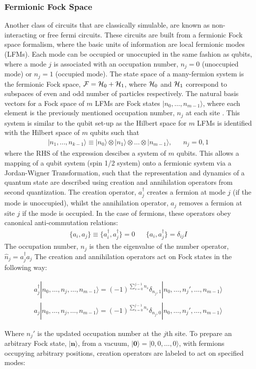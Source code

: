 \subsubsection{Fermionic Fock Space}
Another class of circuits that are classically simulable, are known as non-interacting or free fermi circuits.
These circuits are built from a fermionic Fock space formalism, where the basic units of information are local
fermionic modes (LFMs). Each mode can be occupied or unoccupied in the same fashion as qubits, where
a mode $j$ is associated with an occupation number, $n_j = 0$ (unoccupied mode) or $n_j = 1$ (occupied mode).
The state space of a many-fermion system is the fermionic Fock space, ${\cal F} = {\cal H}_0 + {\cal H}_1$,
where ${\cal H}_0$ and ${\cal H}_1$ correspond to subspaces of even and odd number of particles respectively.
The natural basis vectors for a Fock space of $m$ LFMs are Fock states $|n_0, \dots, n_{m-1}\rangle$,
where each element is the previously mentioned occupation number, $n_j$ at each site \cite{DeFelice2019}.
This system is similar to the qubit set-up as the Hilbert space for $m$ LFMs is identified with the Hilbert space
of $m$ qubits such that
\begin{align*}
    |n_1, \dots, n_{k-1}\rangle \equiv | n_0 \rangle \otimes | n_1 \rangle \otimes \dots \otimes | n_{m-1} \rangle, &  & n_j = 0,1
\end{align*}
where the RHS of the expression descibes a system of $m$ qubits. This allows a mapping of a qubit system (spin 1/2 system) onto
a fermionic system via a Jordan-Wigner Transformation, such that the representation and dynamics of a quantum
state are described using creation and annihilation operators from second quantization.
The creation operator, $a_j^{\dagger}$ creates a fermion at mode $j$ (if the mode is unoccupied),
whilst the annihilation operator, $a_j$ removes a fermion at site $j$ if the mode is occupied.
In the case of fermions, these operators obey canonical anti-commutation relations:
\begin{align}
    \{a_i, a_j\} \equiv \{a_i^{\dagger}, a_j^{\dagger}\} = 0 &  & \{a_i, a_j^{\dagger}\} = \delta_{ij}I
\end{align}
The occupation number, $n_j$ is then the eigenvalue of the number operator, $\hat{n}_j = a^{\dagger}_j a_j$
The creation and annihilation operators act on Fock states in the following way:
\begin{widetext}
    \begin{align*}
        a_j^{\dagger} |n_0, \dots, n_j, \dots, n_{m-1}\rangle = (-1)^{\sum^{j-1}_{s=0}n_s}\delta_{n_j, 1}  |n_0, \dots, n_j', \dots, n_{m-1}\rangle \\
        a_j |n_0, \dots, n_j, \dots, n_{m-1}\rangle = (-1)^{\sum^{j-1}_{s=0}n_s}\delta_{n_j, 0}  |n_0, \dots, n_j', \dots, n_{m-1}\rangle
    \end{align*}
\end{widetext}
Where $n_j'$ is the updated occupation number at the $j$th site.
To prepare an arbitrary Fock state, $|{\mathbf n}\rangle$, from a vacuum, $|{\mathbf 0}\rangle = |0,0,\dots,0\rangle$,
with fermions occupying arbitrary positions, creation operators are labeled to act on specified modes:

